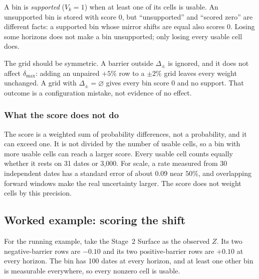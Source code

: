 \documentclass[11pt]{article}
\newcommand{\topic}[1]{\Needspace{6\baselineskip}\subsubsection*{#1}}
\begin{document}
A bin is \emph{supported} ($V_k=1$) when at least one of its cells is usable.
An unsupported bin is stored with score $0$, but ``unsupported'' and ``scored
zero'' are different facts: a supported bin whose mirror shifts are equal
also scores $0$. Losing some horizons does not make a bin unsupported; only
losing every usable cell does.

The grid should be symmetric. A barrier outside $\Delta_\pm$ is ignored, and
it does not affect $\delta_{\max}$: adding an unpaired $+5\%$ row to a
$\pm2\%$ grid leaves every weight unchanged. A grid with $\Delta_\pm=\varnothing$
gives every bin score $0$ and no support. That outcome is a configuration
mistake, not evidence of no effect.

\topic{What the score does not do}

The score is a weighted sum of probability differences, not a probability,
and it can exceed one. It is not divided by the number of usable cells, so a
bin with more usable cells can reach a larger score. Every usable cell
counts equally whether it rests on 31 dates or 3,000. For scale, a rate
measured from 30 independent dates has a standard error of about $0.09$
near $50\%$, and overlapping forward windows make the real uncertainty
larger. The score does not weight cells by this precision.

\subsection{Worked example: scoring the shift}\label{sec:score-example}

For the running example, take the Stage~2 Surface as the observed $Z$. Its
two negative-barrier rows are $-0.10$ and its two positive-barrier rows are
$+0.10$ at every horizon. The bin has 100 dates at every horizon, and at
least one other bin is measurable everywhere, so every nonzero cell is usable.
\end{document}
